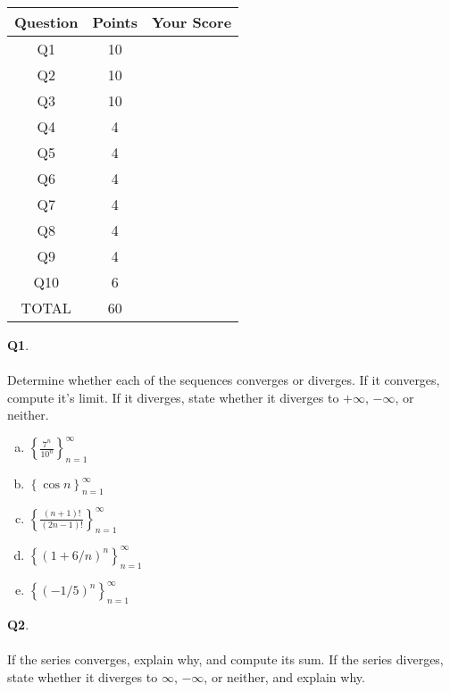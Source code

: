 \documentclass[12pt, oneside]{amsart}
\newcommand{\one}{10}
\newcommand{\two}{10}
\newcommand{\three}{10}
\newcommand{\four}{4}
\newcommand{\five}{4}
\newcommand{\six}{4}
\newcommand{\seven}{4}
\newcommand{\eight}{4}
\newcommand{\nine}{4}
\newcommand{\ten}{6}
\begin{document}
\begin{center}
{\large
\begin{tabular}{|c|c|c|}
\hline
\rule[-0.3cm]{0cm}{1cm}
\textsf{Question} & \textsf{Points} &  \textsf{Your Score} \\
\hline
\hline
\rule[-0.3cm]{0cm}{1cm}
\textsf{Q1} & \one &\\
\hline
\rule[-0.3cm]{0cm}{1cm}
\textsf{Q2} & \two &\\
\hline
\rule[-0.3cm]{0cm}{1cm}
\textsf{Q3} & \three &\\
\hline
\rule[-0.3cm]{0cm}{1cm}
\textsf{Q4} & \four &\\
\hline
\rule[-0.3cm]{0cm}{1cm}
\textsf{Q5} & \five &\\
\hline
\rule[-0.3cm]{0cm}{1cm}
\textsf{Q6} & \six &\\
\hline
\rule[-0.3cm]{0cm}{1cm}
\textsf{Q7} & \seven &\\
\hline
\rule[-0.3cm]{0cm}{1cm}
\textsf{Q8} & \eight &\\
\hline
\rule[-0.3cm]{0cm}{1cm}
\textsf{Q9} & \nine &\\
\hline
\rule[-0.3cm]{0cm}{1cm}
\textsf{Q10} & \ten &\\
 \hline 
\rule[-0.3cm]{0cm}{1cm}
 \textsf{TOTAL} & 60 & \\
 \hline
 \end{tabular}
} 

\end{center}

\vfill


\newpage
\noindent
\textbf{Q1}.\\ \\ Determine whether each of the sequences converges or diverges. If it converges, compute it's limit. If it diverges, state whether it diverges to $+\infty$, $-\infty$, or neither. \\

\begin{enumerate}[a)]
  \item
     $ \left\{ \displaystyle{\frac{7^{n}}{10^{n}}} \right\}_{n=1}^{\infty}$
     \vspace{6cm}
   \item
     $\left\{ \cos n \right\}_{n=1}^{\infty}$
     \vspace{6cm}
   \item
     $\left\{ \displaystyle{\frac{(n+1)!}{(2n-1)!}} \right\}_{n=1}^{\infty}$
\newpage
  \item
     $ \left\{ (1 + 6/n)^{n} \right\}_{n=1}^{\infty}$
     \vspace{9cm}
   \item
     $\left\{ (-1/5)^{n}\right\}_{n=1}^{\infty}$
   \end{enumerate}
\newpage
\noindent
\textbf{Q2}. \\ \\ If the series converges, explain why, and compute its sum. If the series diverges, state whether it diverges to $\infty$, $-\infty$, or neither, and explain why. \\
\end{document}
